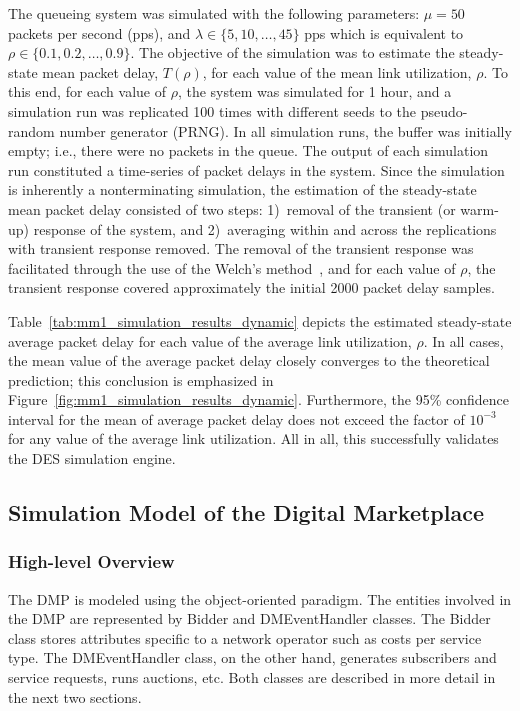 The queueing system was simulated with the following parameters: $\mu=50$ packets per second (pps), and $\lambda\in\{5,10,\ldots,45\}$ pps which is equivalent to $\rho\in\{0.1,0.2,\ldots,0.9\}$. The objective of the simulation was to estimate the steady-state mean packet delay, $T(\rho)$, for each value of the mean link utilization, $\rho$. To this end, for each value of $\rho$, the system was simulated for 1 hour, and a simulation run was replicated 100 times with different seeds to the pseudo-random number generator (PRNG). In all simulation runs, the buffer was initially empty; i.e., there were no packets in the queue. The output of each simulation run constituted a time-series of packet delays in the system. Since the simulation is inherently a nonterminating simulation, the estimation of the steady-state mean packet delay consisted of two steps: 1)~removal of the transient (or warm-up) response of the system, and 2)~averaging within and across the replications with transient response removed. The removal of the transient response was facilitated through the use of the Welch's method~\cite{LawChapter92007}, and for each value of $\rho$, the transient response covered approximately the initial 2000 packet delay samples.

Table~\ref{tab:mm1_simulation_results_dynamic} depicts the estimated steady-state average packet delay for each value of the average link utilization, $\rho$. In all cases, the mean value of the average packet delay closely converges to the theoretical prediction; this conclusion is emphasized in Figure~\ref{fig:mm1_simulation_results_dynamic}. Furthermore, the 95\% confidence interval for the mean of average packet delay does not exceed the factor of $10^{-3}$ for any value of the average link utilization. All in all, this successfully validates the DES simulation engine.

\subsection{Simulation Model of the Digital Marketplace} %
\label{sub:simulation_model_of_the_digital_marketplace_dynamic}

\subsubsection{High-level Overview} %
\label{ssub:high_level_overview_dynamic}
The DMP is modeled using the object-oriented paradigm. The entities involved in the DMP are represented by Bidder and DMEventHandler classes. The Bidder class stores attributes specific to a network operator such as costs per service type. The DMEventHandler class, on the other hand, generates subscribers and service requests, runs auctions, etc. Both classes are described in more detail in the next two sections.

